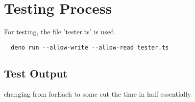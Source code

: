 \chapter{Testing Process}

For testing, the file 'tester.ts' is used.
\begin{verbatim}
  deno run --allow-write --allow-read tester.ts
\end{verbatim}

\section{Test Output}
changing from forEach to some cut the time in half essentially
